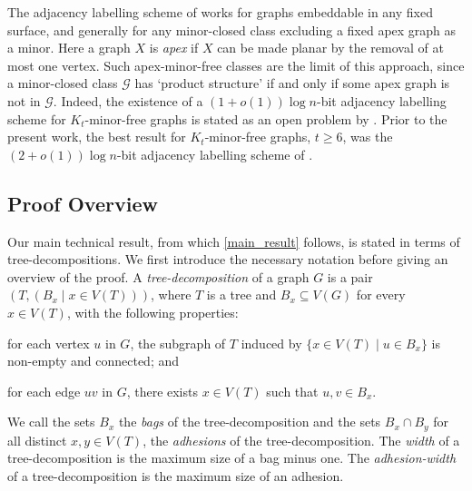 \documentclass{patmorin}
\renewcommand{\geq}{\geqslant}
\newcommand{\defin}[1]{\emph{\textcolor{brightmaroon}{#1}}}
\newcommand{\calG}{\mathcal{G}}
\begin{document}
The adjacency labelling scheme of \citet{dujmovic.esperet.ea:adjacency} works for  graphs embeddable in any fixed surface, and generally for any minor-closed class excluding a fixed apex graph as a minor. Here a graph $X$ is \defin{apex} if $X$ can be made planar by the removal of at most one vertex.
Such apex-minor-free classes are the limit of this approach, since a minor-closed class $\calG$ has `product structure' if and only if some apex graph is not in $\calG$. Indeed, the existence of a $(1+o(1))\log n$-bit adjacency labelling scheme for $K_t$-minor-free graphs is stated as an open problem by \citet[Section~6, Problem~2]{dujmovic.esperet.ea:adjacency}. Prior to the present work, the best result for $K_t$-minor-free graphs, $t\geq 6$, was the $(2+o(1))\log n$-bit adjacency labelling scheme of \citet{gavoille.labourel:shorter}.



\subsection{Proof Overview}

Our main technical result, from which \cref{main_result} follows, is stated in terms of tree-decompositions.  We first introduce the necessary notation before giving an overview of the proof. A \defin{tree-decomposition} of a graph $G$ is a pair $(T,(B_x \mid x \in V(T)))$,
where $T$ is a tree and $B_x \subseteq V(G)$ for every $x \in V(T)$, with the
following properties:
\begin{enumerate*}[label=(\alph*)]
	\item for each vertex $u$ in $G$, the subgraph of $T$ induced by $\{x \in V(T) \mid u \in B_x\}$ is non-empty and connected; and
	\item for each edge $uv$ in $G$, there exists $x\in V(T)$ such that $u,v\in B_x$.
\end{enumerate*}
We call the sets $B_x$ the \defin{bags} of the tree-decomposition and the sets $B_x\cap B_y$ for all distinct $x,y\in V(T)$, the \defin{adhesions} of the tree-decomposition.
The \defin{width} of a tree-decomposition is the maximum size of a bag minus one.
The \defin{adhesion-width} of a tree-decomposition is the maximum size of an adhesion.
\end{document}
